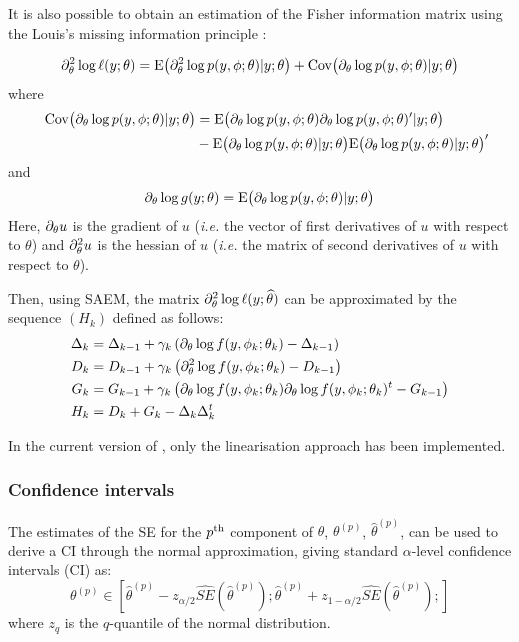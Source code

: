 It is also possible to obtain an estimation of the Fisher information matrix using the Louis's missing information principle \cite{Louis82}:

\begin{equation}\label{louis}
\partial^2_\theta \log \ell(y;\theta) = \mathrm{E}\big(\partial^2_\theta \log p(y,{\phi}; \theta) | y ; \theta \big) +
\mathrm{Cov}\big(\partial_\theta \log p(y,{\phi};\theta)| y ; \theta \big)
\end{equation}
where
\begin{align*} \quad
\mathrm{Cov}\big(\partial_\theta \log p(y,{\phi};\theta)| y ; \theta \big) &=
\mathrm{E} \big(\partial_\theta \log p(y,{\phi}; \theta) \partial_\theta \log p(y,{\phi}; \theta)^\prime |y ; \theta \big)  \\
& -
\mathrm{E} \big( \partial_\theta \log p(y,{\phi}; \theta) |y ; \theta \big)\mathrm{E} \big( \partial_\theta \log p(y,{\phi}; \theta) |y ; \theta \big)^\prime
\end{align*}
and
$$\partial_\theta \log g(y;\theta) = \mathrm{E} \big( \partial_\theta \log p(y,{\phi}; \theta) |y ; \theta \big)$$
Here, $\partial_\theta u$ is the gradient of $u$ ({\it i.e.} the vector of first derivatives of $u$ with respect to $\theta$) and  $\partial^2_\theta u$ is the hessian of $u$ ({\it i.e.} the matrix of second derivatives of $u$ with respect to $\theta$).

Then, using SAEM, the matrix $\partial^2_\theta \log \ell (y;{\widehat{\theta}})$ can be approximated by the sequence $(H_k)$ defined as follows:
\begin{align*}
\Delta_k&=\Delta_{k-1}+\gamma_k\left(\partial_{\theta}\log
f(y,\phi_k;\theta_k)-\Delta_{k-1}\right)\\
D_k  &=   D_{k-1}   +   \gamma_k  \left( \partial^2_\theta \log  f (y,  \phi_k;
    \theta_k)   - D_{k-1} \right) \\
G_k  &=   G_{k-1}   +   \gamma_k  \left(  \partial_\theta \log f(y, \phi_k; \theta_k) \partial_\theta \log f(y, \phi_k; \theta_k)^t - G_{k-1} \right) \\
H_{k} &= D_k + G_k - \Delta_k \Delta_k^t
\end{align*}

In the current version of \saemix, only the linearisation approach has been implemented.

\subsubsection{Confidence intervals}

The estimates of the SE for the $p^{\rm th}$ component of $\theta$, $\theta^{(p)}$, $\hat{\theta}^{(p)}$, can be used to derive a CI through the normal approximation, giving standard $\alpha$-level confidence intervals (CI) as:
\begin{equation} \label{eq:normalCI}
\theta^{(p)} \in \left[ \hat{\theta}^{(p)} - z_{\alpha/2} \hat{SE}(\hat{\theta}^{(p)}); \hat{\theta}^{(p)} + z_{1-\alpha/2} \hat{SE}(\hat{\theta}^{(p)});  \right]
\end{equation}
where $z_q$ is the $q$-quantile of the normal distribution. 

